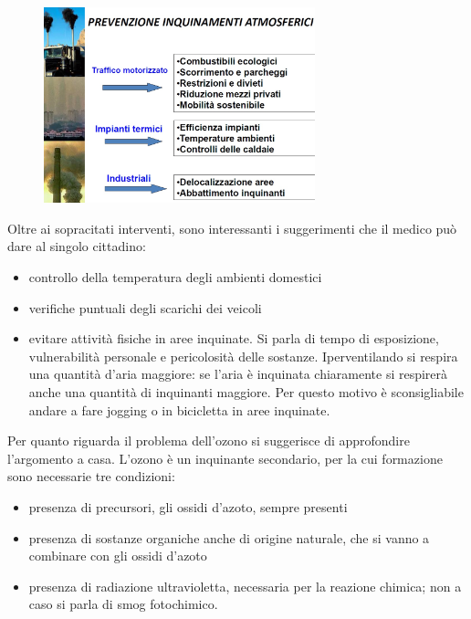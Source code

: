 \begin{figure}[!ht]
\centering
	\includegraphics[width=0.7\textwidth]{23/image7.jpg}
	\end{figure}

Oltre ai sopracitati interventi, sono interessanti i suggerimenti che il
medico può dare al singolo cittadino:

\begin{itemize}
\item
   
  controllo della temperatura degli ambienti domestici
   
\item
   
  verifiche puntuali degli scarichi dei veicoli
   
\item
   
  evitare attività fisiche in aree inquinate. Si parla di tempo di
  esposizione, vulnerabilità personale e pericolosità delle sostanze.
  Iperventilando si respira una quantità d'aria maggiore: se l'aria è
  inquinata chiaramente si respirerà anche una quantità di inquinanti
  maggiore. Per questo motivo è sconsigliabile andare a fare jogging o
  in bicicletta in aree inquinate.
   
\end{itemize}

Per quanto riguarda il problema dell'ozono si suggerisce di approfondire
l'argomento a casa. L'ozono è un inquinante secondario, per la cui
formazione sono necessarie tre condizioni:

\begin{itemize}
\item
   
  presenza di precursori, gli ossidi d'azoto, sempre presenti
   
\item
   
  presenza di sostanze organiche anche di origine naturale, che si vanno
  a combinare con gli ossidi d'azoto
   
\item
   
  presenza di radiazione ultravioletta, necessaria per la reazione
  chimica; non a caso si parla di smog fotochimico.
   
\end{itemize}

